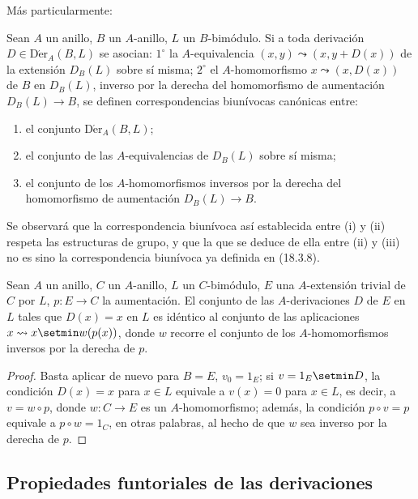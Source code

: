 Más particularmente:

\begin{corollary}[20.1.6]
\label{0.20.1.6-fr}
Sean $A$ un anillo, $B$ un $A$-anillo, $L$ un $B$-bimódulo. Si a toda
derivación $D\in\operatorname{D\acute{e}r}_A(B,L)$ se asocian: $1^\circ$ la
$A$-equivalencia $(x,y)\leadsto(x,y+D(x))$ de la extensión $D_B(L)$ sobre
sí misma; $2^\circ$ el $A$-homomorfismo $x\leadsto(x,D(x))$ de $B$ en
$D_B(L)$, inverso por la derecha del homomorfismo de aumentación $D_B(L)\to B$,
se definen correspondencias biunívocas canónicas entre:
\begin{enumerate}
  \item[\rm(i)] el conjunto $\operatorname{D\acute{e}r}_A(B,L)$;
  \item[\rm(ii)] el conjunto de las $A$-equivalencias de $D_B(L)$ sobre sí misma;
  \item[\rm(iii)] el conjunto de los $A$-homomorfismos inversos por la derecha del
  homomorfismo de aumentación $D_B(L)\to B$.
\end{enumerate}
\end{corollary}

Se observará que la correspondencia biunívoca así establecida entre (i) y (ii)
respeta las estructuras de grupo, y que la que se deduce de ella entre (ii) y
(iii) no es sino la correspondencia biunívoca ya definida en (18.3.8).

\begin{corollary}[20.1.7]
\label{0.20.1.7-fr}
Sean $A$ un anillo, $C$ un $A$-anillo, $L$ un $C$-bimódulo, $E$ una
$A$-extensión trivial de $C$ por $L$, $p:E\to C$ la aumentación. El conjunto
de las $A$-derivaciones $D$ de $E$ en $L$ tales que $D(x)=x$ en $L$ es
idéntico al conjunto de las aplicaciones $x\leadsto x\setmin w(p(x))$, donde $w$
recorre el conjunto de los $A$-homomorfismos inversos por la derecha de $p$.
\end{corollary}

\begin{proof}
Basta aplicar de nuevo  para $B=E$,
$v_0=1_E$; si $v=1_E\setmin D$, la condición $D(x)=x$ para
$x\in L$ equivale a $v(x)=0$ para $x\in L$, es decir, a $v=w\circ p$,
donde $w:C\to E$ es un $A$-homomorfismo; además, la condición
$p\circ v=p$ equivale a $p\circ w=1_C$, en otras palabras, al hecho de
que $w$ sea inverso por la derecha de $p$.
\end{proof}


\subsection{Propiedades funtoriales de las derivaciones}
\label{subsection:0.20.2-fr}


